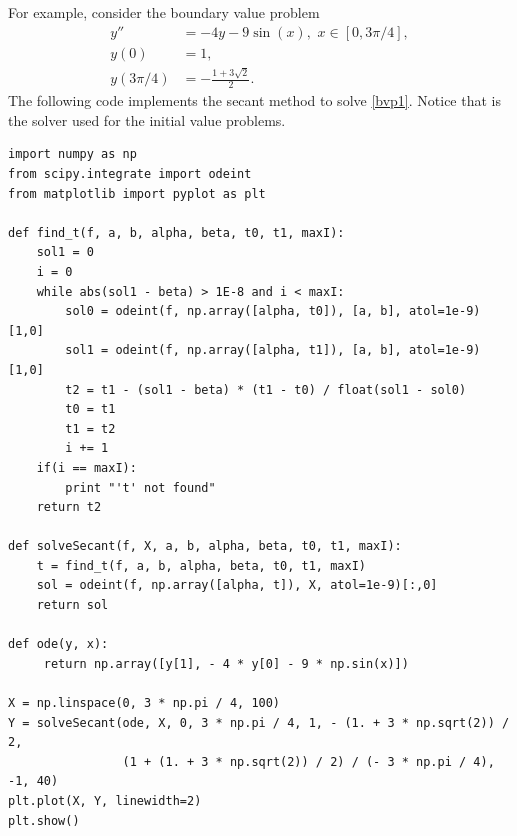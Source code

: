 For example, consider the boundary value problem
\begin{equation}
\begin{split}
\label{bvp1}
y'' &= -4y -9\sin(x), \,\, x \in [0,3\pi/4],\\
y(0) &= 1, \\
y(3 \pi/4) &= -\frac{1+3\sqrt{2}}{2}.
\end{split}
\end{equation}
The following code implements the secant method to solve \eqref{bvp1}. Notice that  is the solver used for the initial value problems.

\begin{lstlisting}
import numpy as np
from scipy.integrate import odeint
from matplotlib import pyplot as plt

def find_t(f, a, b, alpha, beta, t0, t1, maxI):
    sol1 = 0
    i = 0
    while abs(sol1 - beta) > 1E-8 and i < maxI:
        sol0 = odeint(f, np.array([alpha, t0]), [a, b], atol=1e-9)[1,0]
        sol1 = odeint(f, np.array([alpha, t1]), [a, b], atol=1e-9)[1,0]
        t2 = t1 - (sol1 - beta) * (t1 - t0) / float(sol1 - sol0)
        t0 = t1
        t1 = t2
        i += 1
    if(i == maxI):
        print "'t' not found"
    return t2

def solveSecant(f, X, a, b, alpha, beta, t0, t1, maxI):
    t = find_t(f, a, b, alpha, beta, t0, t1, maxI)
    sol = odeint(f, np.array([alpha, t]), X, atol=1e-9)[:,0]
    return sol

def ode(y, x): 
     return np.array([y[1], - 4 * y[0] - 9 * np.sin(x)])

X = np.linspace(0, 3 * np.pi / 4, 100)
Y = solveSecant(ode, X, 0, 3 * np.pi / 4, 1, - (1. + 3 * np.sqrt(2)) / 2,
                (1 + (1. + 3 * np.sqrt(2)) / 2) / (- 3 * np.pi / 4), -1, 40)
plt.plot(X, Y, linewidth=2)
plt.show()
\end{lstlisting}


% 
% 


